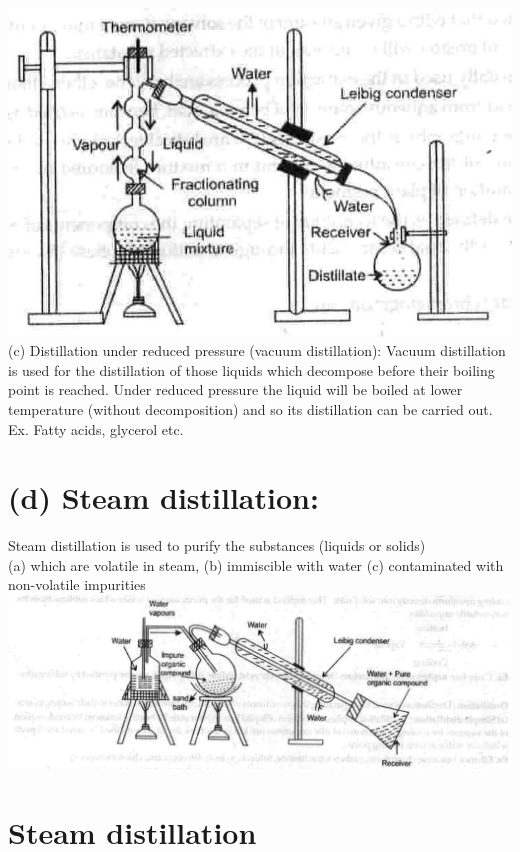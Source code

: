 \documentclass[10pt]{article}
\begin{document}
\includegraphics[max width=\textwidth, center]{2025_01_28_8470952b98110cec3aabg-103}\\
(c) Distillation under reduced pressure (vacuum distillation): Vacuum distillation is used for the distillation of those liquids which decompose before their boiling point is reached. Under reduced pressure the liquid will be boiled at lower temperature (without decomposition) and so its distillation can be carried out.\\
Ex. Fatty acids, glycerol etc.

\section*{(d) Steam distillation:}
Steam distillation is used to purify the substances (liquids or solids)\\
(a) which are volatile in steam, (b) immiscible with water (c) contaminated with non-volatile impurities\\
\includegraphics[max width=\textwidth, center]{2025_01_28_8470952b98110cec3aabg-104}

\section*{Steam distillation}
\end{document}

